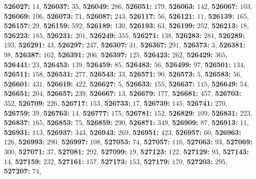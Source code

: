\textsf{\bfseries 526027:} $14$, \textsf{\bfseries 526037:} $35$, \textsf{\bfseries 526049:} $286$, \textsf{\bfseries 526051:} $179$, \textsf{\bfseries 526063:} $142$, \textsf{\bfseries 526067:} $103$, \textsf{\bfseries 526069:} $106$, \textsf{\bfseries 526073:} $71$, \textsf{\bfseries 526087:} $243$, \textsf{\bfseries 526117:} $56$, \textsf{\bfseries 526121:} $11$, \textsf{\bfseries 526139:} $165$, \textsf{\bfseries 526157:} $29$, \textsf{\bfseries 526159:} $592$, \textsf{\bfseries 526189:} $130$, \textsf{\bfseries 526193:} $63$, \textsf{\bfseries 526199:} $252$, \textsf{\bfseries 526213:} $18$, \textsf{\bfseries 526223:} $185$, \textsf{\bfseries 526231:} $201$, \textsf{\bfseries 526249:} $355$, \textsf{\bfseries 526271:} $138$, \textsf{\bfseries 526283:} $281$, \textsf{\bfseries 526289:} $193$, \textsf{\bfseries 526291:} $43$, \textsf{\bfseries 526297:} $247$, \textsf{\bfseries 526307:} $31$, \textsf{\bfseries 526367:} $291$, \textsf{\bfseries 526373:} $3$, \textsf{\bfseries 526381:} $98$, \textsf{\bfseries 526387:} $162$, \textsf{\bfseries 526391:} $206$, \textsf{\bfseries 526397:} $125$, \textsf{\bfseries 526423:} $262$, \textsf{\bfseries 526429:} $365$, \textsf{\bfseries 526441:} $23$, \textsf{\bfseries 526453:} $139$, \textsf{\bfseries 526459:} $85$, \textsf{\bfseries 526483:} $56$, \textsf{\bfseries 526499:} $97$, \textsf{\bfseries 526501:} $134$, \textsf{\bfseries 526511:} $158$, \textsf{\bfseries 526531:} $277$, \textsf{\bfseries 526543:} $33$, \textsf{\bfseries 526571:} $90$, \textsf{\bfseries 526573:} $5$, \textsf{\bfseries 526583:} $56$, \textsf{\bfseries 526601:} $431$, \textsf{\bfseries 526619:} $422$, \textsf{\bfseries 526627:} $5$, \textsf{\bfseries 526633:} $155$, \textsf{\bfseries 526637:} $115$, \textsf{\bfseries 526649:} $54$, \textsf{\bfseries 526651:} $204$, \textsf{\bfseries 526657:} $239$, \textsf{\bfseries 526667:} $13$, \textsf{\bfseries 526679:} $177$, \textsf{\bfseries 526681:} $457$, \textsf{\bfseries 526703:} $352$, \textsf{\bfseries 526709:} $226$, \textsf{\bfseries 526717:} $153$, \textsf{\bfseries 526733:} $17$, \textsf{\bfseries 526739:} $145$, \textsf{\bfseries 526741:} $270$, \textsf{\bfseries 526759:} $39$, \textsf{\bfseries 526763:} $14$, \textsf{\bfseries 526777:} $175$, \textsf{\bfseries 526781:} $152$, \textsf{\bfseries 526829:} $109$, \textsf{\bfseries 526831:} $223$, \textsf{\bfseries 526837:} $165$, \textsf{\bfseries 526853:} $75$, \textsf{\bfseries 526859:} $290$, \textsf{\bfseries 526871:} $349$, \textsf{\bfseries 526909:} $87$, \textsf{\bfseries 526913:} $11$, \textsf{\bfseries 526931:} $113$, \textsf{\bfseries 526937:} $343$, \textsf{\bfseries 526943:} $269$, \textsf{\bfseries 526951:} $423$, \textsf{\bfseries 526957:} $60$, \textsf{\bfseries 526963:} $126$, \textsf{\bfseries 526993:} $290$, \textsf{\bfseries 526997:} $108$, \textsf{\bfseries 527053:} $74$, \textsf{\bfseries 527057:} $116$, \textsf{\bfseries 527063:} $93$, \textsf{\bfseries 527069:} $300$, \textsf{\bfseries 527071:} $37$, \textsf{\bfseries 527081:} $292$, \textsf{\bfseries 527099:} $19$, \textsf{\bfseries 527123:} $122$, \textsf{\bfseries 527129:} $93$, \textsf{\bfseries 527143:} $14$, \textsf{\bfseries 527159:} $232$, \textsf{\bfseries 527161:} $157$, \textsf{\bfseries 527173:} $153$, \textsf{\bfseries 527179:} $170$, \textsf{\bfseries 527203:} $295$, \textsf{\bfseries 527207:} $74$, 
